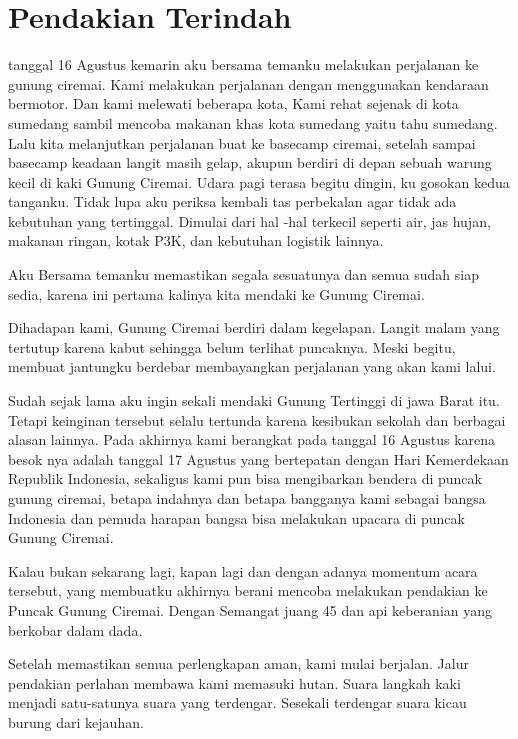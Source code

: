 \chapter*{Pendakian Terindah}

 tanggal 16 Agustus kemarin aku bersama temanku melakukan perjalanan ke gunung ciremai. Kami melakukan perjalanan dengan menggunakan kendaraan bermotor. Dan kami melewati beberapa kota, Kami rehat sejenak di kota sumedang sambil mencoba makanan khas kota sumedang yaitu tahu sumedang. Lalu kita melanjutkan perjalanan buat ke basecamp ciremai, setelah sampai basecamp keadaan langit masih gelap, akupun berdiri di depan sebuah warung kecil di kaki Gunung Ciremai. Udara pagi terasa begitu dingin, ku gosokan kedua tanganku. Tidak lupa aku periksa kembali tas perbekalan agar tidak ada kebutuhan yang tertinggal. Dimulai dari hal -hal terkecil seperti air, jas hujan, makanan ringan, kotak P3K, dan kebutuhan logistik lainnya.


Aku Bersama temanku memastikan segala sesuatunya dan semua sudah siap sedia, karena ini pertama kalinya kita mendaki ke Gunung Ciremai.


Dihadapan kami, Gunung Ciremai berdiri dalam kegelapan. Langit malam yang tertutup karena kabut sehingga belum terlihat puncaknya. Meski begitu, membuat jantungku berdebar membayangkan perjalanan yang akan kami lalui.


Sudah sejak lama aku ingin sekali mendaki Gunung Tertinggi di jawa Barat itu. Tetapi keinginan tersebut selalu tertunda karena kesibukan sekolah dan berbagai alasan lainnya. Pada akhirnya kami berangkat pada tanggal 16 Agustus karena besok nya adalah tanggal 17 Agustus yang bertepatan dengan Hari Kemerdekaan Republik Indonesia, sekaligus kami pun bisa mengibarkan bendera di puncak gunung ciremai, betapa indahnya dan betapa bangganya kami sebagai bangsa Indonesia dan pemuda harapan bangsa bisa melakukan upacara di puncak Gunung Ciremai.


Kalau bukan sekarang lagi, kapan lagi dan dengan adanya momentum acara tersebut, yang membuatku akhirnya berani mencoba melakukan pendakian ke Puncak Gunung Ciremai. Dengan Semangat juang 45 dan api keberanian yang berkobar dalam dada.


Setelah memastikan semua perlengkapan aman, kami mulai berjalan. Jalur pendakian perlahan membawa kami memasuki hutan. Suara langkah kaki menjadi satu-satunya suara yang terdengar. Sesekali terdengar suara kicau burung dari kejauhan.


